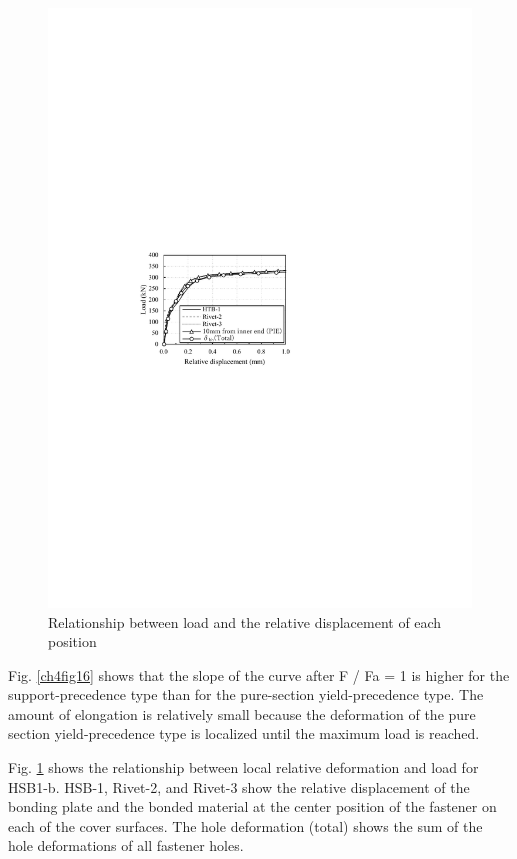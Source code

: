 \begin{figure}
\begin{minipage}[t]{0.48\textwidth}
    \includegraphics[width=\linewidth]{imgs/ch4/fig17.pdf}
    \caption{Relationship between load and the relative displacement of each position}
    \label{ch4fig17}
    \end{minipage}
\end{figure}

Fig. \ref{ch4fig16} shows that the slope of the curve after F / Fa = 1 is higher for the support-precedence type than for the pure-section yield-precedence type. The amount of elongation is relatively small because the deformation of the pure section yield-precedence type is localized until the maximum load is reached.

Fig. \ref{ch4fig17} shows the relationship between local relative deformation and load for HSB1-b. HSB-1, Rivet-2, and Rivet-3 show the relative displacement of the bonding plate and the bonded material at the center position of the fastener on each of the cover surfaces. The hole deformation (total) shows the sum of the hole deformations of all fastener holes.

